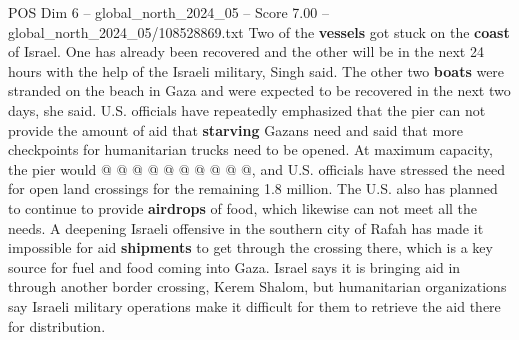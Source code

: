 \begin{textsample}{POS Dim 6 – global\_north\_2024\_05 – Score 7.00 – global\_north\_2024\_05/108528869.txt}
Two of the \textbf{vessels} got stuck on the \textbf{coast} of Israel.
One has already been recovered and the other will be in the next 24 hours with the help of the Israeli military, Singh said.
The other two \textbf{boats} were stranded on the beach in Gaza and were expected to be recovered in the next two days, she said.
U.S. officials have repeatedly emphasized that the pier can not provide the amount of aid that \textbf{starving} Gazans need and said that more checkpoints for humanitarian trucks need to be opened.
At maximum capacity, the pier would @ @ @ @ @ @ @ @ @ @, and U.S. officials have stressed the need for open land crossings for the remaining 1.8 million.
The U.S. also has planned to continue to provide \textbf{airdrops} of food, which likewise can not meet all the needs.
A deepening Israeli offensive in the southern city of Rafah has made it impossible for aid \textbf{shipments} to get through the crossing there, which is a key source for fuel and food coming into Gaza.
Israel says it is bringing aid in through another border crossing, Kerem Shalom, but humanitarian organizations say Israeli military operations make it difficult for them to retrieve the aid there for distribution.

\end{textsample}
